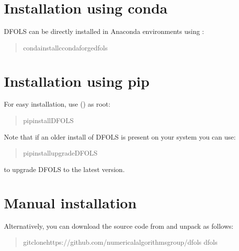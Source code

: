 \documentclass[letterpaper,10pt,english]{sphinxmanual}
\begin{document}
\section{Installation using conda}
\label{\detokenize{install:installation-using-conda}}
\sphinxAtStartPar
DFO\sphinxhyphen{}LS can be directly installed in Anaconda environments using :
\begin{quote}

\begin{sphinxVerbatim}[commandchars=\\\{\}]
\PYGZdl{}condainstall\PYGZhy{}cconda\PYGZhy{}forgedfo\PYGZhy{}ls
\end{sphinxVerbatim}
\end{quote}


\section{Installation using pip}
\label{\detokenize{install:installation-using-pip}}
\sphinxAtStartPar
For easy installation, use  () as root:
\begin{quote}

\begin{sphinxVerbatim}[commandchars=\\\{\}]
\PYGZdl{}pipinstallDFO\PYGZhy{}LS
\end{sphinxVerbatim}
\end{quote}

\sphinxAtStartPar
Note that if an older install of DFO\sphinxhyphen{}LS is present on your system you can use:
\begin{quote}

\begin{sphinxVerbatim}[commandchars=\\\{\}]
\PYGZdl{}pipinstall\PYGZhy{}\PYGZhy{}upgradeDFO\PYGZhy{}LS
\end{sphinxVerbatim}
\end{quote}

\sphinxAtStartPar
to upgrade DFO\sphinxhyphen{}LS to the latest version.


\section{Manual installation}
\label{\detokenize{install:manual-installation}}
\sphinxAtStartPar
Alternatively, you can download the source code from  and unpack as follows:
\begin{quote}

\begin{sphinxVerbatim}[commandchars=\\\{\}]
\PYGZdl{}gitclonehttps://github.com/numericalalgorithmsgroup/dfols
\PYGZdl{}dfols
\end{sphinxVerbatim}
\end{quote}
\end{document}
